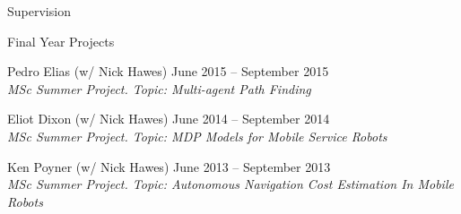 \begin{rSection}{Supervision}
\begin{rSubsection}{Final Year Projects}{}{}{}
\item  Pedro Elias (w/ Nick Hawes)  \hfill June 2015 -- September 2015\\
\textit{MSc Summer Project. Topic: Multi-agent Path Finding}

\item  Eliot Dixon  (w/ Nick Hawes) \hfill June 2014 -- September 2014\\
\textit{MSc Summer Project. Topic: MDP Models for Mobile Service Robots}

\item  Ken Poyner (w/ Nick Hawes) \hfill June 	2013 -- September 2013\\
\textit{MSc Summer Project. Topic: Autonomous Navigation Cost Estimation In Mobile Robots}

\end{rSubsection}

\end{rSection}
